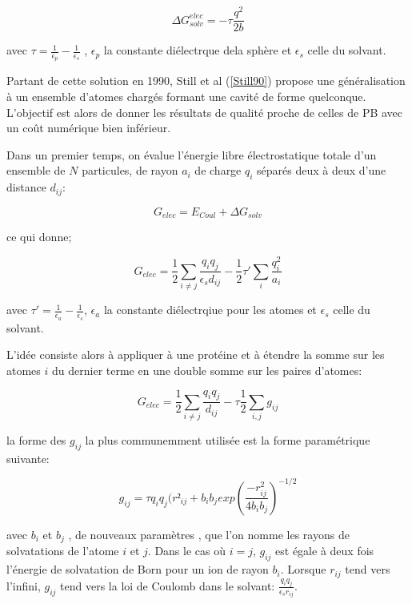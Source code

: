 \begin{equation}
  \label{eq:Born}
  \Delta G_{solv}^{elec} = - \tau \frac{q^2}{2b}
\end{equation}


avec $ \tau = \frac{1}{\epsilon_p} - \frac{1}{\epsilon_s}$ , $\epsilon_p$ la constante diélectrque dela sphère et $\epsilon_s$ celle du solvant.

Partant de cette solution en 1990, Still et al (\ref{Still90}) propose une généralisation à un ensemble d'atomes chargés formant une cavité de forme quelconque. L'objectif est alors de donner les résultats de qualité proche de celles de PB avec un coût numérique bien inférieur.

Dans un premier temps, on évalue l'énergie libre électrostatique totale d'un ensemble de $N$ particules, de rayon $a_i$ de charge $q_i$ séparés deux à deux d'une distance $d_{ij}$:


\begin{equation}
  \label{eq:GB}
  G_{elec} =  E_{Coul} + \Delta G_{solv}
\end{equation}

ce qui donne;

\begin{equation}
  \label{eq:GB}
 G_{elec} =  \frac{1}{2}  \sum_{i \neq j} \frac{q_iq_j}{\epsilon_s d_{ij}}- \frac{1}{2}  \tau' \sum_i\frac{q_i^2}{a_i}
\end{equation}

avec $ \tau' = \frac{1}{\epsilon_a} - \frac{1}{\epsilon_s}$, $\epsilon_a$ la constante diélectrqiue pour les atomes et $ \epsilon_s$ celle du solvant.


L'idée consiste alors à appliquer   \label{eq:GB} à une protéine et à étendre la somme sur les atomes $i$ du dernier terme en une double somme sur les paires d'atomes:

\begin{equation}
  G_{elec} = \frac{1}{2} \sum_{i \neq j} \frac{q_iq_j}{d_{ij}} - \tau \frac{1}{2} \sum_{i,j} g_{ij}
\end{equation}

la forme des $g_{ij}$ la plus communemment utilisée est la forme paramétrique suivante:


\begin{equation}
  \label{eq:GBg}
  g_{ij}= \tau q_iq_j (r²_{ij} + b_ib_j exp(\frac{-r^2_{ij}}{4b_ib_j})^{-1/2} 
\end{equation}

avec $b_i$ et $b_j$  , de nouveaux paramètres , que l'on nomme les rayons de solvatations de l'atome $i$ et $j$.
Dans le cas où $i=j$, $g_{ij}$ est égale à deux fois l'énergie de solvatation de Born pour un ion de rayon $b_i$.
Lorsque $r_{ij}$ tend vers l'infini, $g_{ij}$ tend vers la loi de Coulomb dans le solvant: $\frac{q_iq_j}{\epsilon_s r_{ij}}$.


